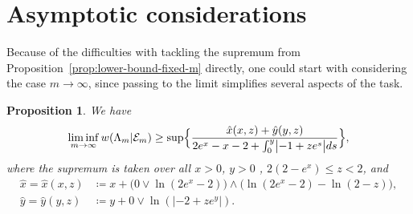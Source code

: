 \documentclass[a4paper]{amsart} %
\newtheorem{proposition}[theorem]{Proposition} %
\theoremstyle{definition}
\theoremstyle{remark}
\numberwithin{equation}{section}
\newcommand*{\weakconstrestricted}[2]{w(#1|#2)} %
\newcommand*{\fclass}[1]{\mathcal{E}_{#1}}
\newcommand*{\xGain}{\hat{x}}
\newcommand*{\yGain}{\hat{y}}
\begin{document}
\section{Asymptotic considerations}

\label{APP:interlude}




%
%
%
%
% 
%
%
%


Because of the difficulties with 
tackling the supremum from Proposition~\ref{prop:lower-bound-fixed-m}
directly,
one could start with considering the case $m\to\infty$,
since passing to the limit simplifies several aspects of the task.

\begin{proposition}
	\label{prop:lower-bound-asymptotic}
	We have
	\begin{equation}
	\label{eq:lower-bound-asymptotic}
	\liminf_{m\to \infty} \weakconstrestricted{\Lambda_m}{\fclass{m}} 
	\geq 
	\sup\Bigl\{ 
	\frac{\xGain(x,z) + \yGain(y,z)}{ 2e^{x} -x - 2  +  \int_{0}^{y} \bigl| -1 +  z  e^{s}\bigr| ds}
	\Bigr\},
	\end{equation}
	where the supremum is taken over all
	$ x>0$, $y >0$ , $2(2-e^x) \leq z < 2 $, and
	\begin{align*}
	\xGain = \xGain(x,z) &\coloneqq x + \bigl(0 \lor \ln(2e^x - 2)\bigr)\land \bigl(\ln(2e^x-2) - \ln(2-z)\bigr),\\
	\yGain = \yGain(y,z) &\coloneqq y +  0\lor \ln(|-2 + z e^{y}|).
	\end{align*}
\end{proposition}
\end{document}
